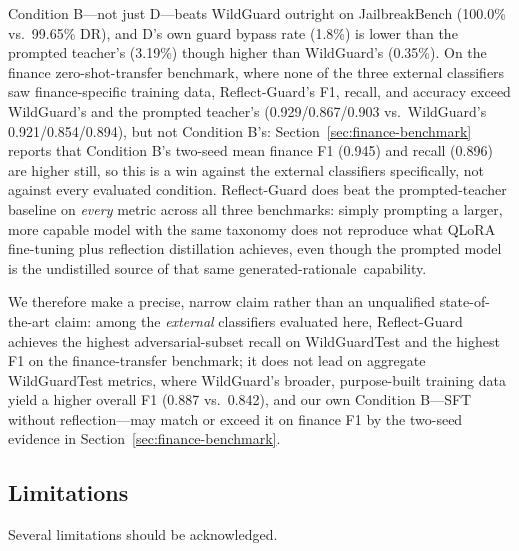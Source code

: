 \documentclass[superintelligence,article,accept,moreauthors]{Definitions/mdpi}
\begin{document}
Condition B---not just D---beats WildGuard outright on JailbreakBench (100.0\% vs.\ 99.65\% DR), and D's own guard bypass rate (1.8\%) is lower than the prompted teacher's (3.19\%) though higher than WildGuard's (0.35\%). On the finance zero-shot-transfer benchmark, where none of the three external classifiers saw finance-specific training data, Reflect-Guard's F1, recall, and accuracy exceed WildGuard's and the prompted teacher's (0.929/0.867/0.903 vs.\ WildGuard's 0.921/0.854/0.894), but not Condition B's: Section~\ref{sec:finance-benchmark} reports that Condition B's two-seed mean finance F1 (0.945) and recall (0.896) are higher still, so this is a win against the external classifiers specifically, not against every evaluated condition. Reflect-Guard does beat the prompted-teacher baseline on \emph{every} metric across all three benchmarks: simply prompting a larger, more capable model with the same taxonomy does not reproduce what QLoRA fine-tuning plus reflection distillation achieves, even though the prompted model is the undistilled source of that same generated-\mbox{rationale capability.}

We therefore make a precise, narrow claim rather than an unqualified state-of-the-art claim: among the \emph{external} classifiers evaluated here, Reflect-Guard achieves the highest adversarial-subset recall on WildGuardTest and the highest F1 on the finance-transfer benchmark; it does not lead on aggregate WildGuardTest metrics, where WildGuard's broader, purpose-built training data yield a higher overall F1 (0.887 vs.\ 0.842), and our own Condition B---SFT without reflection---may match or exceed it on finance F1 by the two-seed evidence in Section~\ref{sec:finance-benchmark}.

\subsection{Limitations}
\label{sec:limitations}

Several limitations should be acknowledged.
\end{document}
